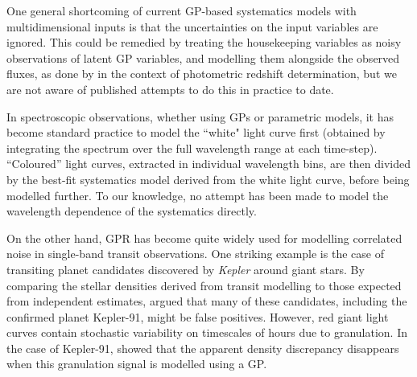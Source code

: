 \documentclass[letterpaper]{ar-1col}
\begin{document}
One general shortcoming of current GP-based systematics models with multidimensional inputs is that the uncertainties on the input variables are ignored. This could be remedied by treating the housekeeping variables as noisy observations of latent GP variables, and modelling them alongside the observed fluxes, as done by \citet{2016MNRAS.462..726A} in the context of photometric redshift determination, but we are not aware of published attempts to do this in practice to date. \begin{armarginnote}
\end{armarginnote}
In spectroscopic observations, whether using GPs or parametric models, it has become standard practice to model the ``white" light curve first (obtained by integrating the spectrum over the full wavelength range at each time-step). ``Coloured'' light curves, extracted in individual wavelength bins, are then divided by the best-fit systematics model derived from the white light curve, before being modelled further. To our knowledge, no attempt has been made to model the wavelength dependence of the systematics directly.

On the other hand, GPR has become quite widely used for modelling correlated noise in single-band transit observations. One striking example is the case of transiting planet candidates discovered by \textit{Kepler} around giant stars. By comparing the stellar densities derived from transit modelling to those expected from independent estimates, \citet{2014ApJ...788..148S} argued that many of these candidates, including the confirmed planet Kepler-91, might be false positives. However, red giant light curves contain stochastic variability on timescales of hours due to granulation. In the case of Kepler-91, \citet{2015ApJ...800...46B} showed that the apparent density discrepancy disappears when this granulation signal is modelled using a GP.
\end{document}
